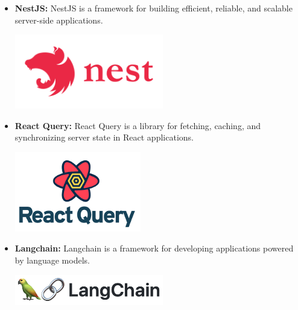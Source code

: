 \begin{itemize}
\begin{minipage}{\linewidth}
          \end{minipage}
    \item \textbf{NestJS:} \newline NestJS \cite{NestJS} is a framework for building efficient, reliable, and scalable server-side applications. \newline \newline
          \begin{minipage}{\linewidth}
              \centering
              \includegraphics[width=6.5cm]{src/assets/logos/nestjs_logo_icon.png}
          \end{minipage}
    \item \textbf{React Query:} \newline React Query \cite{ReactQuery} is a library for fetching, caching, and synchronizing server state in React applications. \newline \newline
          \begin{minipage}{\linewidth}
              \centering
              \includegraphics[width=5.5cm]{src/assets/logos/react-query.png}
          \end{minipage}
    \item \textbf{Langchain:} \newline Langchain \cite{Langchain} is a framework for developing applications powered by language models. \newline \newline
          \begin{minipage}{\linewidth}
              \centering
              \includegraphics[width=6.5cm]{src/assets/logos/langchain.png}
          \end{minipage}
\end{itemize}

